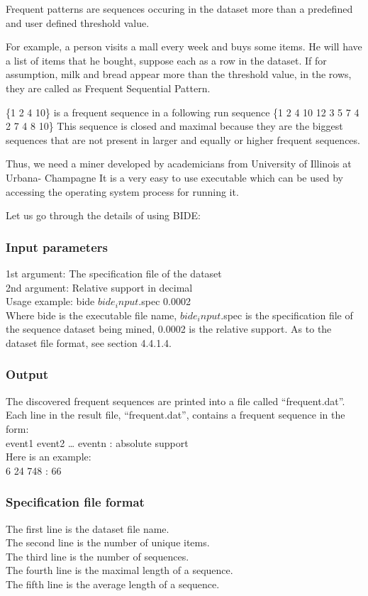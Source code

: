 Frequent patterns are sequences occuring in the dataset more than a predefined and user defined threshold value\cite{Han:2007:FPM:1275092.1275097}.

For example, a person visits a mall every week and buys some items. He will have a list of items that he bought, suppose each as a row in the dataset. If for assumption, milk and bread appear more than the threshold value, in the rows, they are called as Frequent Sequential Pattern.

 \{1 2 4 10\} is a frequent sequence in a following run sequence \{1 2 4 10 12 3 5 7 4 2 7 4 8 10\} 
 This sequence is closed and maximal because they are the biggest sequences that are not present in larger and equally or higher frequent sequences.
 
 Thus, we need a miner developed by academicians from University of Illinois at Urbana- Champagne \cite{Wang:2004:BEM:977401.978142}
 It is a very easy to use executable which can be used by accessing the operating system process for running it.
 
 Let us go through the details of using BIDE:
 
\subsubsection{Input parameters}
\tab1st argument: The specification file of the dataset\\
\tab2nd argument: Relative support in decimal\\
Usage example: bide $bide_input$.spec 0.0002\\
Where bide is the executable file name, $bide_input$.spec is the specification file of the sequence dataset being mined, 0.0002 is the relative support.
As to the dataset file format, see section 4.4.1.4.

\subsubsection{Output}
The discovered frequent sequences are printed into a file called “frequent.dat”.\\
Each line in the result file, “frequent.dat”, contains a frequent sequence in the form:\\
event1 event2 … eventn : absolute support\\
Here is an example:\\
6 24 748 : 66\\


\subsubsection{Specification file format}
The first line is the dataset file name.\\
The second line is the number of unique items.\\ 
The third line is the number of sequences.\\ 
The fourth line is the maximal length of a sequence.\\
The fifth line is the average length of a sequence.

